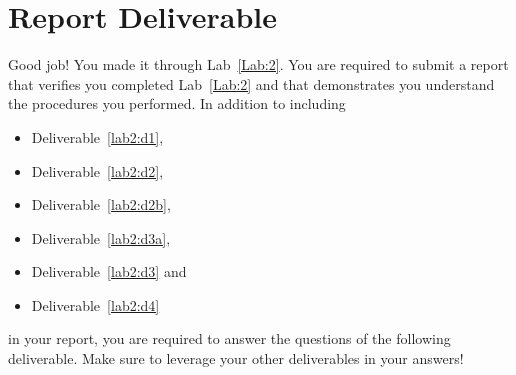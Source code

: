\section{Report Deliverable}
Good job! You made it through Lab~\ref{Lab:2}.
You are required to submit a report
that verifies you completed Lab~\ref{Lab:2} and that demonstrates you
understand the procedures you performed. In addition to including
\begin{itemize}
  \item{Deliverable~\ref{lab2:d1},}
  \item{Deliverable~\ref{lab2:d2},}
  \item{Deliverable~\ref{lab2:d2b},}
  \item{Deliverable~\ref{lab2:d3a},}
  \item{Deliverable~\ref{lab2:d3} and }
  \item{Deliverable~\ref{lab2:d4}}
\end{itemize}
in your report,
you are required to answer the questions of the following deliverable.
Make sure to leverage your other deliverables in your answers!
